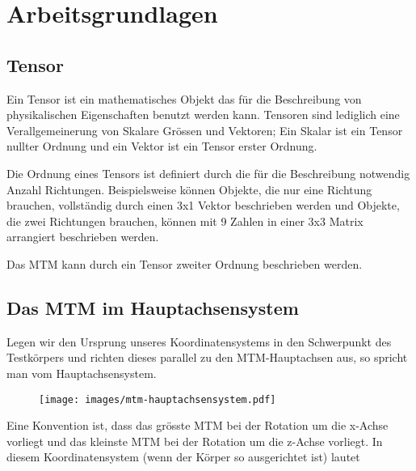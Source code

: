 \section{Arbeitsgrundlagen}

\subsection{Tensor}

Ein  Tensor ist  ein  mathematisches  Objekt  das  f\"ur  die  Beschreibung  von
physikalischen Eigenschaften benutzt werden kann.  Tensoren  sind lediglich eine
Verallgemeinerung von Skalare Gr\"ossen  und Vektoren; Ein Skalar ist ein Tensor
nullter Ordnung und ein Vektor ist ein Tensor erster Ordnung.

Die  Ordnung  eines  Tensors  ist  definiert  durch die f\"ur  die  Beschreibung
notwendig  Anzahl  Richtungen.  Beispielsweise  k\"onnen  Objekte, die nur  eine
Richtung brauchen, vollst\"andig  durch  einen 3x1 Vektor beschrieben werden und
Objekte, die zwei Richtungen brauchen, k\"onnen mit 9 Zahlen in einer 3x3 Matrix
arrangiert beschrieben werden.

Das MTM kann durch ein Tensor zweiter Ordnung beschrieben werden.


\subsection{Das MTM im Hauptachsensystem}

Legen  wir  den Ursprung  unseres  Koordinatensystems  in  den  Schwerpunkt  des
Testk\"orpers und richten dieses parallel zu den MTM-Hauptachsen aus, so spricht
man vom Hauptachsensystem.

\begin{figure}[H]
    \center
    \texttt{[image: images/mtm-hauptachsensystem.pdf]}
    \caption{}
\end{figure}

Eine Konvention ist, dass das gr\"osste MTM  bei  der  Rotation  um  die x-Achse
vorliegt und das kleinste MTM bei der  Rotation  um  die  z-Achse  vorliegt.  In
diesem  Koordinatensystem  (wenn  der  K\"orper  so   ausgerichtet  ist)  lautet

